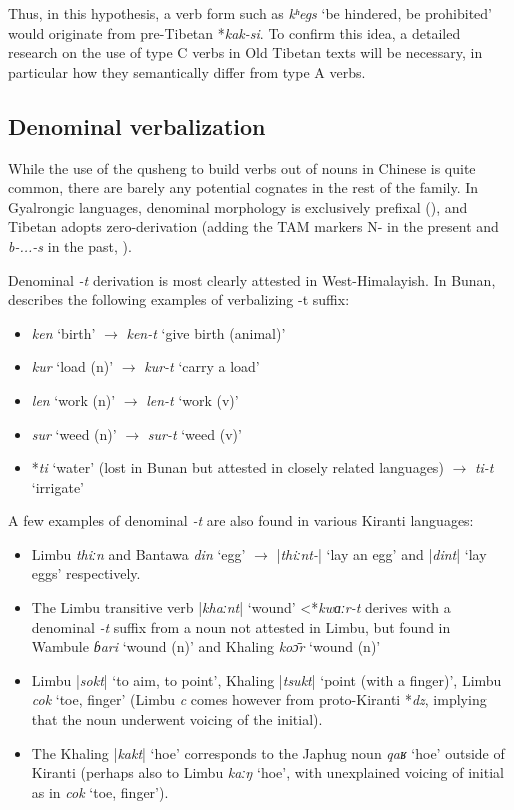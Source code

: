 \documentclass[oneside,a4paper,11pt]{article}
\newcommand{\ipa}[1]{{\phon\textit{\mbox{#1}}}}
\newcommand{\dhatu}[2]{|\ipa{#1}| `#2'}
\begin{document}
Thus, in this hypothesis, a verb form such as \ipa{kʰegs} ‘be hindered, be prohibited’ would originate from pre-Tibetan *\ipa{kak-si}. To confirm this idea, a detailed research on the use of type C verbs in Old Tibetan texts will be necessary, in particular how they semantically differ from type A verbs.

 
\subsection{Denominal verbalization}
While the use of the qusheng to build verbs out of nouns in Chinese is quite common, there are barely any potential cognates in the rest of the family. In Gyalrongic languages, denominal morphology is exclusively prefixal (\citealt{jacques14antipassive}), and Tibetan adopts zero-derivation (adding the TAM markers N- in the present and \textit{b-...-s} in the past, \citealt[29]{jacques14esquisse}). 


Denominal \ipa{-t} derivation is most clearly attested in West-Himalayish. In Bunan, \citet[426]{widmer14bunan} describes the following examples of verbalizing -t suffix: 

\begin{itemize}
\item \ipa{ken} `birth' $\rightarrow$ \ipa{ken-t} `give birth (animal)'
\item \ipa{kur} `load (n)' $\rightarrow$ \ipa{kur-t} `carry a load'
\item \ipa{len} `work (n)' $\rightarrow$ \ipa{len-t} `work (v)'
\item \ipa{sur} `weed (n)' $\rightarrow$ \ipa{sur-t} `weed (v)'
\item *\ipa{ti} `water' (lost in Bunan but attested in closely related languages) $\rightarrow$ \ipa{ti-t} `irrigate'
\end{itemize}

A few examples of denominal \ipa{-t} are also found in various Kiranti languages:
\begin{itemize}
\item Limbu \ipa{thiːn} and Bantawa \ipa{din} `egg' $\rightarrow$ \dhatu{thiːnt-}{lay an egg} and \dhatu{dint}{lay eggs} respectively.  
\item The Limbu transitive verb \dhatu{khaːnt}{wound} <*\ipa{kwɑːr-t} derives with a denominal \ipa{-t} suffix from a noun not attested in Limbu, but found in Wambule \ipa{ɓari} `wound (n)' and Khaling \ipa{koɔ̄r} `wound (n)'
 \item Limbu \dhatu{sokt}{to aim, to point}, Khaling \dhatu{tsukt}{point (with a finger)}, Limbu \ipa{cok} `toe, finger' (Limbu \ipa{c} comes however from proto-Kiranti *\ipa{dz}, implying that the noun underwent voicing of the initial).
 \item The Khaling \dhatu{kakt}{hoe} corresponds to the Japhug noun \ipa{qaʁ} `hoe' outside of Kiranti (perhaps also to Limbu \ipa{kaːŋ} `hoe', with unexplained voicing of initial as in \ipa{cok} `toe, finger').
\end{itemize}
\end{document}
